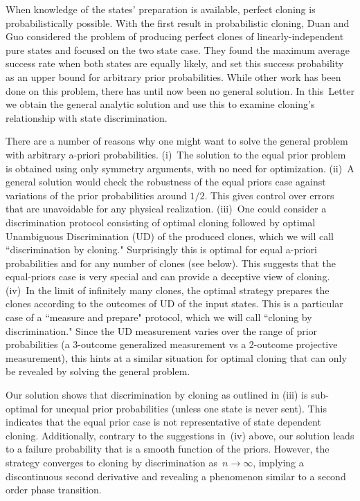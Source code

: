 \documentclass[aps,prl,twocolumn,showpacs]{revtex4}
\begin{document}
When knowledge of the states' preparation is available, perfect cloning is probabilistically possible. With the first result in probabilistic cloning, Duan and Guo \cite{DuanGuo} considered the problem of producing perfect clones of linearly-independent pure states and focused on the two state case.  They found the maximum average success rate when both states are equally likely, and set this success probability as an upper bound for arbitrary prior probabilities.  While other work has been done on this problem, there has until now been no general solution. In this~Letter we obtain the general analytic solution and use this to examine cloning's relationship with state discrimination.
 
There are a number of reasons why one might want to solve the general problem with arbitrary a-priori probabilities.  (i)~The solution to the equal prior problem is obtained using only symmetry arguments, with no need for optimization. (ii)~A general solution would check the robustness of the equal priors case against variations of the prior probabilities around $1/2$.  This gives control over errors that are unavoidable for any physical realization. (iii)~One could consider a discrimination protocol consisting of optimal cloning followed by optimal Unambiguous Discrimination (UD) of the produced clones, which we will call ``discrimination by cloning." Surprisingly this is optimal for equal a-priori probabilities and for any number of clones (see below).  This suggests that the equal-priors case is very special and can provide a deceptive view of cloning.  (iv)~In the limit of infinitely many clones, the optimal strategy prepares the clones according to the outcomes of UD of the input states. This is a particular case of a ``measure and prepare" protocol, which we will call ``cloning by discrimination." Since the UD measurement varies over the range of prior probabilities (a 3-outcome generalized measurement vs a 2-outcome projective measurement), this hints at a similar situation for optimal cloning that can only be revealed by solving the general problem. 

Our solution shows that discrimination by cloning as outlined in (iii) is sub-optimal for unequal prior probabilities (unless one state is never sent). This indicates that the equal prior case is not representative of state dependent cloning.  Additionally, contrary to the suggestions in~(iv) above, our solution leads to a failure probability that is a smooth function of the priors. However,  the strategy converges to cloning by discrimination as~$n\to\infty$, implying a discontinuous second derivative and revealing a phenomenon similar to a second order phase transition.
\end{document}
